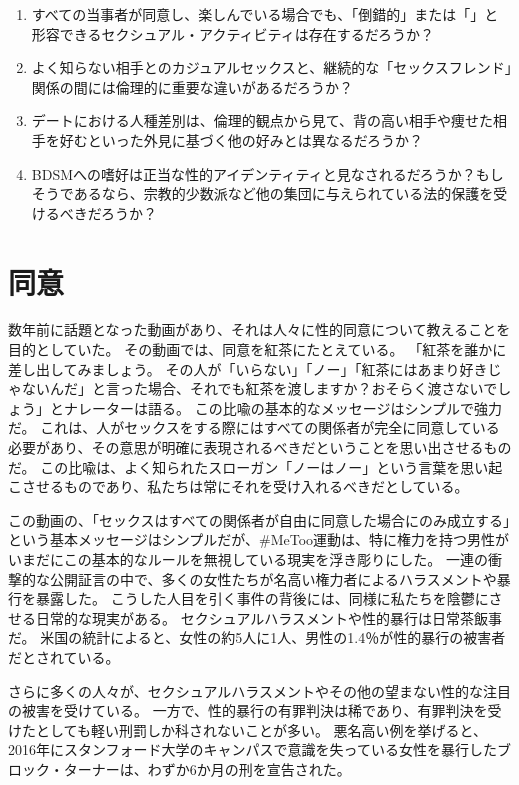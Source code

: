 \documentclass[paper=a4,book,openany]{jlreq}
\begin{document}
\begin{enumerate}
    \item すべての当事者が同意し、楽しんでいる場合でも、「倒錯的」または「」と形容できるセクシュアル・アクティビティは存在するだろうか？
    \item よく知らない相手とのカジュアルセックスと、継続的な「セックスフレンド」関係の間には倫理的に重要な違いがあるだろうか？
    \item デートにおける人種差別は、倫理的観点から見て、背の高い相手や痩せた相手を好むといった外見に基づく他の好みとは異なるだろうか？
    \item BDSMへの嗜好は正当な性的アイデンティティと見なされるだろうか？もしそうであるなら、宗教的少数派など他の集団に与えられている法的保護を受けるべきだろうか？
\end{enumerate}

\chapter{同意}

数年前に話題となった動画があり、それは人々に性的同意について教えることを目的としていた。
その動画では、同意を紅茶にたとえている。
「紅茶を誰かに差し出してみましょう。
その人が「いらない」「ノー」「紅茶にはあまり好きじゃないんだ」と言った場合、それでも紅茶を渡しますか？おそらく渡さないでしょう」とナレーターは語る。
この比喩の基本的なメッセージはシンプルで強力だ。
これは、人がセックスをする際にはすべての関係者が完全に同意している必要があり、その意思が明確に表現されるべきだということを思い出させるものだ。
この比喩は、よく知られたスローガン「ノーはノー」という言葉を思い起こさせるものであり、私たちは常にそれを受け入れるべきだとしている\citep{may15:_consen}。

この動画の、「セックスはすべての関係者が自由に同意した場合にのみ成立する」という基本メッセージはシンプルだが、\#MeToo運動は、特に権力を持つ男性がいまだにこの基本的なルールを無視している現実を浮き彫りにした。
一連の衝撃的な公開証言の中で、多くの女性たちが名高い権力者によるハラスメントや暴行を暴露した。
こうした人目を引く事件の背後には、同様に私たちを陰鬱にさせる日常的な現実がある。
セクシュアルハラスメントや性的暴行は日常茶飯事だ。
米国の統計によると、女性の約5人に1人、男性の1.4％が性的暴行の被害者だとされている\citep{black11:_nation_intim_partn_sexual_violen_survey}。

さらに多くの人々が、セクシュアルハラスメントやその他の望まない性的な注目の被害を受けている。
一方で、性的暴行の有罪判決は稀であり、有罪判決を受けたとしても軽い刑罰しか科されないことが多い。
悪名高い例を挙げると、2016年にスタンフォード大学のキャンパスで意識を失っている女性を暴行したブロック・ターナーは、わずか6か月の刑を宣告された\citep{stack16:_light_senten_brock}。
\end{document}

